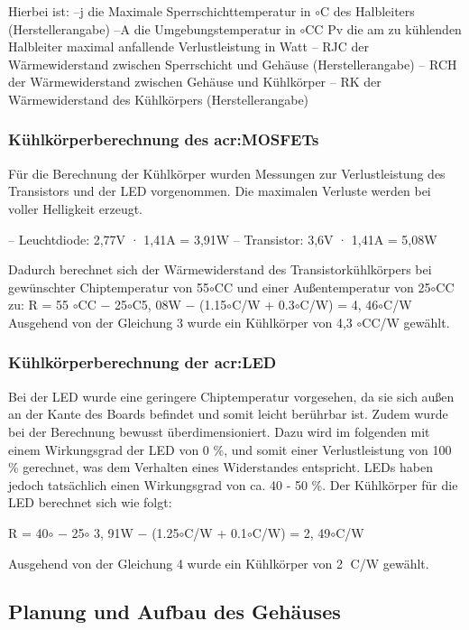 Hierbei ist:
–j die Maximale Sperrschichttemperatur in $\circ$C des Halbleiters (Herstellerangabe)
–A die Umgebungstemperatur in $\circ$CC
Pv die am zu kühlenden Halbleiter maximal anfallende Verlustleistung in
Watt
– RJC der Wärmewiderstand zwischen Sperrschicht und Gehäuse (Herstellerangabe)
– RCH der Wärmewiderstand zwischen Gehäuse und Kühlkörper
– RK der Wärmewiderstand des Kühlkörpers (Herstellerangabe)

\subsubsection{Kühlkörperberechnung des \gls{acr:MOSFET}s}
\label{subsub:Unterunterabschnitt1}

Für die Berechnung der Kühlkörper wurden Messungen zur Verlustleistung des
Transistors und der LED vorgenommen. Die maximalen Verluste werden bei voller
Helligkeit erzeugt.

– Leuchtdiode: 2,77V · 1,41A = 3,91W
– Transistor: 3,6V · 1,41A = 5,08W

Dadurch berechnet sich der Wärmewiderstand des Transistorkühlkörpers bei gewünschter
Chiptemperatur von 55$\circ$CC und einer Außentemperatur von 25$\circ$CC zu:
R = 55 $\circ$CC − 25$\circ$C5, 08W − (1.15$\circ$C/W + 0.3$\circ$C/W) = 4, 46$\circ$C/W
Ausgehend von der Gleichung 3 wurde ein Kühlkörper von 4,3 $\circ$CC/W gewählt.

\subsubsection{Kühlkörperberechnung der \gls{acr:LED}}
\label{subsub:Unterunterabschnitt1}

Bei der LED wurde eine geringere Chiptemperatur vorgesehen, da sie sich außen
an der Kante des Boards befindet und somit leicht berührbar ist. Zudem wurde
bei der Berechnung bewusst überdimensioniert. Dazu wird im folgenden mit einem
Wirkungsgrad der LED von 0 \%, und somit einer Verlustleistung von 100  \%
gerechnet, was dem Verhalten eines Widerstandes entspricht. LEDs haben jedoch
tatsächlich einen Wirkungsgrad von ca. 40 - 50 \%.
Der Kühlkörper für die LED berechnet sich wie folgt:

R = 40$\circ$ − 25$\circ$ 3, 91W − (1.25$\circ$C/W + 0.1$\circ$C/W) = 2, 49$\circ$C/W

Ausgehend von der Gleichung 4 wurde ein Kühlkörper von 2 C/W gewählt.

\subsection{Planung und Aufbau des Gehäuses}
\label{subsec:Unterabschnitt12}

